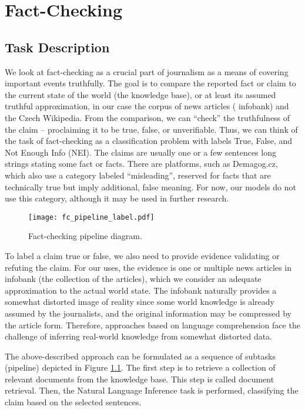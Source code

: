\chapter{Fact-Checking}

\section{Task Description}

We look at fact-checking as a crucial part of journalism as a means of covering important events truthfully. 
The goal is to compare the reported fact or claim to the current state of the world (the knowledge base), or at least its assumed truthful approximation, in our case the corpus of \CTK{} news articles (\CTK{} infobank) and the Czech Wikipedia.
From the comparison, we can ``check'' the truthfulness of the claim -- proclaiming it to be true, false, or unverifiable. 
Thus, we can think of the task of fact-checking as a classification problem with labels True, False, and Not Enough Info (NEI). 
The claims are usually one or a few sentences long strings stating some fact or facts. 
There are platforms, such as Demagog.cz, which also use a category labeled ``misleading'', reserved for facts that are technically true but imply additional, false meaning.
For now, our models do not use this category, although it may be used in further research.

\begin{figure}[h!]
    \centering
    \texttt{[image: fc\_pipeline\_label.pdf]}
    \caption{Fact-checking pipeline diagram.}
    \label{fig:pipeline}
\end{figure}

To label a claim true or false, we also need to provide evidence validating or refuting the claim.
For our uses, the evidence is one or multiple news articles in \CTK{} infobank (the collection of the articles), which we consider an adequate approximation to the actual world state.
The infobank naturally provides a somewhat distorted image of reality since some world knowledge is already assumed by the journalists, and the original information may be compressed by the article form. 
Therefore, approaches based on language comprehension face the challenge of inferring real-world knowledge from somewhat distorted data. 

The above-described approach can be formulated as a sequence of subtasks (pipeline) depicted in Figure \ref{fig:pipeline}. The first step is to retrieve a collection of relevant documents from the knowledge base. This step is called document retrieval. Then, the Natural Language Inference task is performed, classifying the claim based on the selected sentences.

